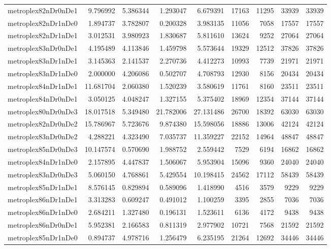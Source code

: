 \begin{longtable}{|l|r|r|r|r|r|r|r|r|}
metroplex82nDr0nDe1 & 9.796992 & 5.386344 & 1.293047 & 6.679391 & 17163 & 11295 & 33939 & 33939 \\
metroplex82nDr1nDe0 & 1.894737 & 3.782807 & 0.200328 & 3.983135 & 11056 & 7058 & 17557 & 17557 \\
metroplex82nDr1nDe1 & 3.012531 & 3.980923 & 1.830687 & 5.811610 & 13624 & 9252 & 27064 & 27064 \\
metroplex83nDr0nDe1 & 4.195489 & 4.113846 & 1.459798 & 5.573644 & 19329 & 12512 & 37826 & 37826 \\
metroplex83nDr1nDe1 & 3.145363 & 2.141537 & 2.270736 & 4.412273 & 10993 & 7739 & 21971 & 21971 \\
metroplex83nDr1nDe0 & 2.000000 & 4.206086 & 0.502707 & 4.708793 & 12930 & 8156 & 20434 & 20434 \\
metroplex84nDr1nDe1 & 11.681704 & 2.060380 & 1.520239 & 3.580619 & 11761 & 8160 & 23511 & 23511 \\
metroplex84nDr0nDe1 & 3.050125 & 4.048247 & 1.327155 & 5.375402 & 18969 & 12354 & 37144 & 37144 \\
metroplex80nDr0nDe3 & 18.017518 & 5.349480 & 21.782006 & 27.131486 & 26700 & 18392 & 63030 & 63030 \\
metroplex82nDr0nDe2 & 15.786967 & 5.723676 & 9.874380 & 15.598056 & 18886 & 13006 & 42124 & 42124 \\
metroplex83nDr0nDe2 & 4.288221 & 4.323490 & 7.035737 & 11.359227 & 22152 & 14964 & 48847 & 48847 \\
metroplex85nDr0nDe3 & 10.147574 & 0.570690 & 1.988752 & 2.559442 & 7529 & 6194 & 16862 & 16862 \\
metroplex84nDr1nDe0 & 2.157895 & 4.447837 & 1.506067 & 5.953904 & 15096 & 9360 & 24040 & 24040 \\
metroplex83nDr0nDe3 & 5.060150 & 4.768861 & 5.429554 & 10.198415 & 24562 & 17112 & 58439 & 58439 \\
metroplex85nDr1nDe1 & 8.576145 & 0.829894 & 0.589096 & 1.418990 & 4516 & 3579 & 9229 & 9229 \\
metroplex86nDr1nDe1 & 3.313283 & 0.609247 & 0.491012 & 1.100259 & 3395 & 2855 & 7036 & 7036 \\
metroplex86nDr1nDe0 & 2.684211 & 1.327480 & 0.196131 & 1.523611 & 6136 & 4172 & 9438 & 9438 \\
metroplex86nDr0nDe1 & 5.952381 & 2.166583 & 0.811319 & 2.977902 & 10721 & 7568 & 21592 & 21592 \\
metroplex85nDr1nDe0 & 0.894737 & 4.978716 & 1.256479 & 6.235195 & 21264 & 12692 & 34446 & 34446 \\

\end{longtable}
